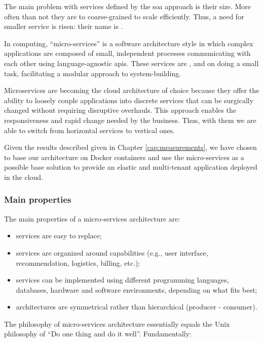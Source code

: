 The main problem with services defined by the \ac{soa} approach is their size. More often than not
they are to coarse-grained to scale efficiently. Thus, a need for smaller service is risen: their
name is .

In computing, ``micro-services'' is a software architecture style in which complex applications are
composed of small, independent processes communicating with each other using language-agnostic 
\acs{api}s. These services are ,  and 
 on doing a small task, facilitating a modular approach to system-building.

Microservices are becoming the cloud architecture of choice because they offer the ability to 
loosely couple applications into discrete services that can be surgically changed without requiring
disruptive overhauls. This approach enables the responsiveness and rapid change needed by the business.
Thus, with them we are able to switch from horizontal services to vertical ones.

Given the results described given in Chapter \ref{cap:measurements}, we have chosen to base our
architecture on Docker containers and use the micro-services as a possible base solution to provide an
elastic and multi-tenant application deployed in the cloud.

\subsubsection{Main properties}
\label{sec:architecture-soaRevisitation-microServices-properties}
The main properties of a micro-services architecture are:

\begin{itemize}
	\item{services are easy to replace;}
	\item{services are organized around capabilities (e.g., user interface, recommendation,
		logistics, billing, etc.);}
	\item{services can be implemented using different programming languages, databases, hardware and
			software environments, depending on what fits best;}
	\item{architectures are symmetrical rather than hierarchical (producer - consumer).}
\end{itemize}
			
The philosophy of micro-services architecture essentially equals the Unix philosophy of ``Do one thing and do
it well''. Fundamentally:
			
